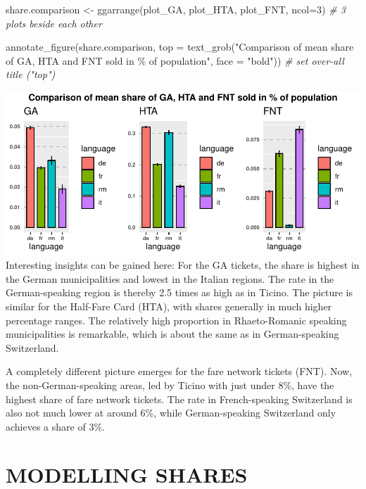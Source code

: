 \documentclass[
]{article}
\newenvironment{Shaded}{\begin{snugshade}}{\end{snugshade}}
\newcommand{\AttributeTok}[1]{\textcolor[rgb]{0.77,0.63,0.00}{#1}}
\newcommand{\CommentTok}[1]{\textcolor[rgb]{0.56,0.35,0.01}{\textit{#1}}}
\newcommand{\DecValTok}[1]{\textcolor[rgb]{0.00,0.00,0.81}{#1}}
\newcommand{\FunctionTok}[1]{\textcolor[rgb]{0.00,0.00,0.00}{#1}}
\newcommand{\NormalTok}[1]{#1}
\newcommand{\OtherTok}[1]{\textcolor[rgb]{0.56,0.35,0.01}{#1}}
\newcommand{\StringTok}[1]{\textcolor[rgb]{0.31,0.60,0.02}{#1}}
\begin{document}
\begin{Shaded}
\begin{Highlighting}[]
\NormalTok{share.comparison }\OtherTok{\textless{}{-}} \FunctionTok{ggarrange}\NormalTok{(plot\_GA, plot\_HTA, plot\_FNT, }\AttributeTok{ncol=}\DecValTok{3}\NormalTok{) }\CommentTok{\# 3 plots beside each other}

\FunctionTok{annotate\_figure}\NormalTok{(share.comparison, }
    \AttributeTok{top =} \FunctionTok{text\_grob}\NormalTok{(}\StringTok{"Comparison of mean share of GA, HTA and FNT sold in \% of population"}\NormalTok{, }
                                \AttributeTok{face =} \StringTok{"bold"}\NormalTok{)) }\CommentTok{\# set over{-}all title ("top")}
\end{Highlighting}
\end{Shaded}

\includegraphics{Influence_factors_files/figure-latex/1.11_language_shares-1.pdf}
Interesting insights can be gained here: For the GA tickets, the share
is highest in the German municipalities and lowest in the Italian
regions. The rate in the German-speaking region is thereby 2.5 times as
high as in Ticino. The picture is similar for the Half-Fare Card (HTA),
with shares generally in much higher percentage ranges. The relatively
high proportion in Rhaeto-Romanic speaking municipalities is remarkable,
which is about the same as in German-speaking Switzerland.

A completely different picture emerges for the fare network tickets
(FNT). Now, the non-German-speaking areas, led by Ticino with just under
8\%, have the highest share of fare network tickets. The rate in
French-speaking Switzerland is also not much lower at around 6\%, while
German-speaking Switzerland only achieves a share of 3\%.

\newpage

\hypertarget{modelling-shares}{%
\section{MODELLING SHARES}\label{modelling-shares}}
\end{document}
